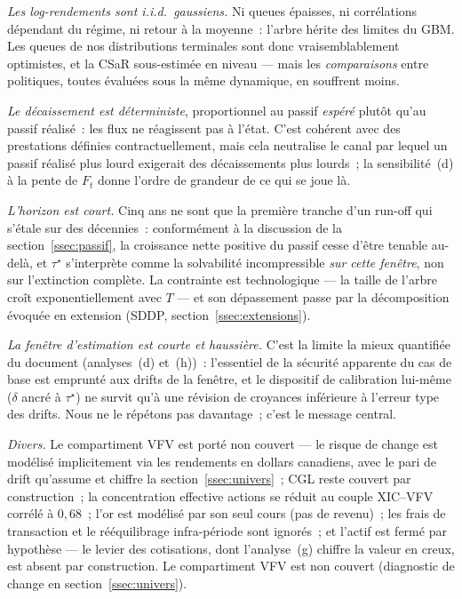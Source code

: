 \documentclass[11pt,letterpaper]{article}
\newcommand{\taustar}{\tau^{\star}}
\theoremstyle{definition}
\begin{document}
\emph{Les log-rendements sont i.i.d.\ gaussiens.} Ni queues épaisses, ni
corrélations dépendant du régime, ni retour à la moyenne~: l'arbre hérite des
limites du GBM. Les queues de nos distributions terminales sont donc
vraisemblablement optimistes, et la CSaR sous-estimée en niveau --- mais les
\emph{comparaisons} entre politiques, toutes évaluées sous la même dynamique,
en souffrent moins.

\emph{Le décaissement est déterministe}, proportionnel au passif \emph{espéré}
plutôt qu'au passif réalisé~: les flux ne réagissent pas à l'état. C'est
cohérent avec des prestations définies contractuellement, mais cela neutralise
le canal par lequel un passif réalisé plus lourd exigerait des décaissements
plus lourds~; la sensibilité~(d) à la pente de $F_t$ donne l'ordre de grandeur
de ce qui se joue là.

\emph{L'horizon est court.} Cinq ans ne sont que la première tranche d'un
run-off qui s'étale sur des décennies~: conformément à la discussion de la
section~\ref{ssec:passif}, la croissance nette positive du passif cesse
d'être tenable au-delà, et $\taustar$ s'interprète comme la solvabilité
incompressible \emph{sur cette fenêtre}, non sur l'extinction complète. La
contrainte est technologique --- la taille de l'arbre croît
exponentiellement avec $T$ --- et son dépassement passe par la décomposition
évoquée en extension (SDDP, section~\ref{ssec:extensions}).

\emph{La fenêtre d'estimation est courte et haussière.} C'est la limite la
mieux quantifiée du document (analyses~(d) et~(h))~: l'essentiel de la
sécurité apparente du cas de base est emprunté aux drifts de la fenêtre, et le
dispositif de calibration lui-même ($\delta$ ancré à $\taustar$) ne survit
qu'à une révision de croyances inférieure à l'erreur type des drifts. Nous ne
le répétons pas davantage~; c'est le message central.

\emph{Divers.} Le compartiment VFV est porté non couvert --- le risque de change
est modélisé implicitement via les rendements en dollars canadiens, avec le
pari de drift qu'assume et chiffre la section~\ref{ssec:univers}~; CGL reste
couvert par construction~;
la concentration effective actions se réduit au couple XIC--VFV corrélé à
$0{,}68$~; l'or est modélisé par son seul cours (pas de revenu)~; les frais de
transaction et le rééquilibrage infra-période sont ignorés~; et l'actif est
fermé par hypothèse --- le levier des cotisations, dont l'analyse~(g) chiffre
la valeur en creux, est absent par construction. Le compartiment VFV est
non couvert (diagnostic de change en section~\ref{ssec:univers}).
\end{document}
